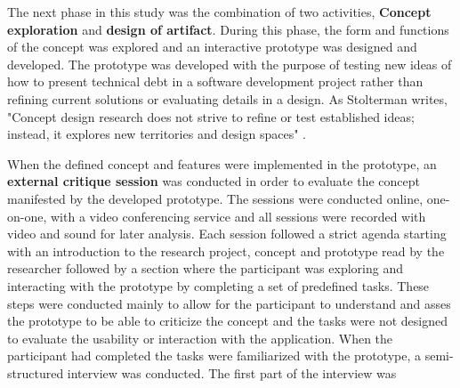 The next phase in this study was the combination of two activities, \textbf{Concept exploration}  and \textbf{design of artifact}.
During this phase, the form and functions of the concept was explored and an interactive prototype was designed and developed.
The prototype was developed with the purpose of testing new ideas of how to present technical debt in a software development project rather than refining current solutions or evaluating details in a design.
As Stolterman writes, "Concept design research does not strive to refine or test established ideas; instead, it explores new territories and design spaces" \cite{stolterman_concept-driven_2010}.

When the defined concept and features were implemented in the prototype, an \textbf{external critique session} was conducted in order to evaluate the concept manifested by the developed prototype.
The sessions were conducted online, one-on-one, with a video conferencing service and all sessions were recorded with video and sound for later analysis.
Each session followed a strict agenda starting with an introduction to the research project, concept and prototype read by the researcher followed by a section where the participant was exploring and interacting with the prototype by completing a set of predefined tasks.
These steps were conducted mainly to allow for the participant to understand and asses the prototype to be able to criticize the concept and the tasks were not designed to evaluate the usability or interaction with the application.
When the participant had completed the tasks were familiarized with the prototype, a semi-structured interview was conducted.
The first part of the interview was 